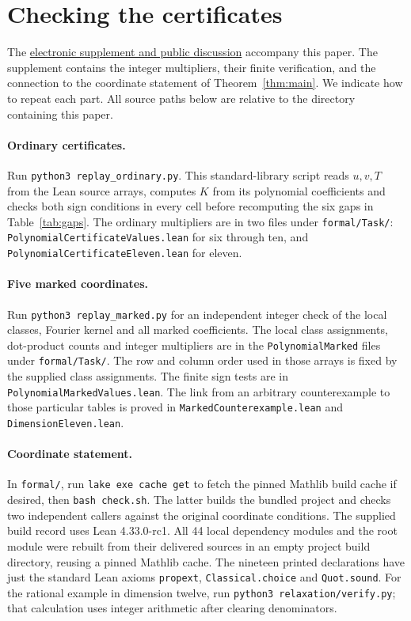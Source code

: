 \documentclass[11pt]{article}
\theoremstyle{definition}\newtheorem{definition}[theorem]{Definition}
\theoremstyle{remark}\newtheorem{remark}[theorem]{Remark}
\begin{document}
\appendix
\section{Checking the certificates}\label{sec:replay}
The \href{https://github.com/lisresearchgroup/math-rsi/pull/67}{electronic supplement and public discussion} accompany this paper. The supplement contains the integer multipliers, their finite verification, and the connection to the coordinate statement of Theorem~\ref{thm:main}. We indicate how to repeat each part. All source paths below are relative to the directory containing this paper.

\paragraph{Ordinary certificates.} Run \texttt{python3 replay\_ordinary.py}. This standard-library script reads $u,v,T$ from the Lean source arrays, computes $K$ from its polynomial coefficients and checks both sign conditions in every cell before recomputing the six gaps in Table~\ref{tab:gaps}. The ordinary multipliers are in two files under \texttt{formal/Task/}: \texttt{Polynomial\-Certificate\-Values.lean} for six through ten, and \texttt{Polynomial\-Certificate\-Eleven.lean} for eleven.

\paragraph{Five marked coordinates.} Run \texttt{python3 replay\_marked.py} for an independent integer check of the local classes, Fourier kernel and all marked coefficients. The local class assignments, dot-product counts and integer multipliers are in the \texttt{PolynomialMarked} files under \texttt{formal/Task/}. The row and column order used in those arrays is fixed by the supplied class assignments. The finite sign tests are in \texttt{PolynomialMarkedValues.lean}. The link from an arbitrary counterexample to those particular tables is proved in \texttt{MarkedCounterexample.lean} and \texttt{DimensionEleven.lean}.

\paragraph{Coordinate statement.} In \texttt{formal/}, run \texttt{lake exe cache get} to fetch the pinned Mathlib build cache if desired, then \texttt{bash check.sh}. The latter builds the bundled project and checks two independent callers against the original coordinate conditions. The supplied build record uses Lean 4.33.0-rc1. All 44 local dependency modules and the root module were rebuilt from their delivered sources in an empty project build directory, reusing a pinned Mathlib cache. The nineteen printed declarations have just the standard Lean axioms \texttt{propext}, \texttt{Classical.choice} and \texttt{Quot.sound}. For the rational example in dimension twelve, run \texttt{python3 relaxation/verify.py}; that calculation uses integer arithmetic after clearing denominators.


\end{document}
